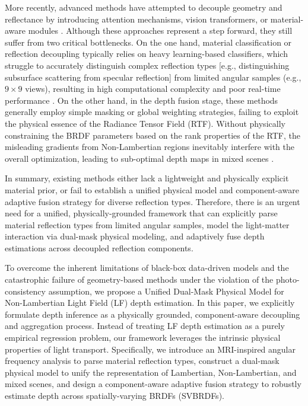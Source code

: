\documentclass[lettersize,journal]{IEEEtran}
\begin{document}
More recently, advanced methods have attempted to decouple geometry and reflectance by introducing attention mechanisms, vision transformers, or material-aware modules \cite{attentionmechanismsmaterial}. Although these approaches represent a step forward, they still suffer from two critical bottlenecks. On the one hand, material classification or reflection decoupling typically relies on heavy learning-based classifiers, which struggle to accurately distinguish complex reflection types  [e.g., distinguishing subsurface scattering from specular reflection] from limited angular samples (e.g., $9 \times 9$ views), resulting in high computational complexity and poor real-time performance \cite{heavylearningbasedclassifie}. On the other hand, in the depth fusion stage, these methods generally employ simple masking or global weighting strategies, failing to exploit the physical essence of the Radiance Tensor Field (RTF). Without physically constraining the BRDF parameters based on the rank properties of the RTF, the misleading gradients from Non-Lambertian regions inevitably interfere with the overall optimization, leading to sub-optimal depth maps in mixed scenes \cite{misleadinggradientssuboptim}.

In summary, existing methods either lack a lightweight and physically explicit material prior, or fail to establish a unified physical model and component-aware adaptive fusion strategy for diverse reflection types. Therefore, there is an urgent need for a unified, physically-grounded framework that can explicitly parse material reflection types from limited angular samples, model the light-matter interaction via dual-mask physical modeling, and adaptively fuse depth estimations across decoupled reflection components.

To overcome the inherent limitations of black-box data-driven models and the catastrophic failure of geometry-based methods under the violation of the photo-consistency assumption, we propose a Unified Dual-Mask Physical Model for Non-Lambertian Light Field (LF) depth estimation. In this paper, we explicitly formulate depth inference as a physically grounded, component-aware decoupling and aggregation process. Instead of treating LF depth estimation as a purely empirical regression problem, our framework leverages the intrinsic physical properties of light transport. Specifically, we introduce an MRI-inspired angular frequency analysis to parse material reflection types, construct a dual-mask physical model to unify the representation of Lambertian, Non-Lambertian, and mixed scenes, and design a component-aware adaptive fusion strategy to robustly estimate depth across spatially-varying BRDFs (SVBRDFs).
\end{document}
